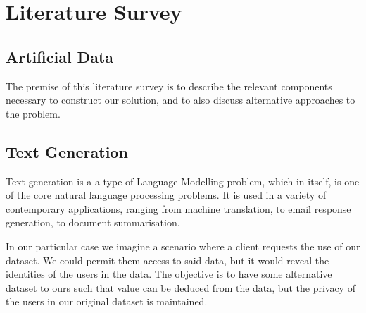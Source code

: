\documentclass[12pt,twoside]{report}
\begin{document}
\chapter{Literature Survey}

\section{Artificial Data}


The premise of this literature survey is to describe the relevant components necessary to construct our solution, and to also discuss alternative approaches to the problem. 



\section{Text Generation}






Text generation is a a type of Language Modelling problem, which in itself, is one of the core natural language processing problems. It is used in a variety of contemporary applications, ranging from machine translation, to email response generation, to document summarisation.

In our particular case we imagine a scenario where a client requests the use of our dataset. We could permit them access to said data, but it would reveal the identities of the users in the data. The objective is to have some alternative dataset to ours such that value can be deduced from the data, but the privacy of the users in our original dataset is maintained.
\end{document}
